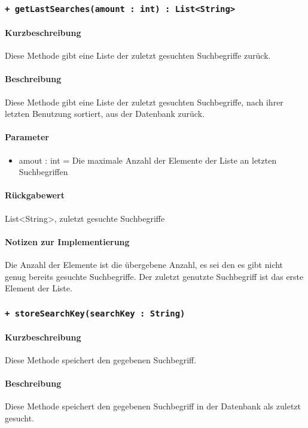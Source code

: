 \subsubsection{\texttt{+ getLastSearches(amount : int) : List<String>}}%
\paragraph*{Kurzbeschreibung}
Diese Methode gibt eine Liste der zuletzt gesuchten Suchbegriffe zurück.
\paragraph*{Beschreibung}
Diese Methode gibt eine Liste der zuletzt gesuchten Suchbegriffe, nach ihrer letzten Benutzung sortiert, aus der Datenbank zurück.
\paragraph*{Parameter}
\begin{itemize}
    \item amout : int = Die maximale Anzahl der Elemente der Liste an letzten Suchbegriffen
\end{itemize}
\paragraph*{Rückgabewert}
List<String>, zuletzt gesuchte Suchbegriffe
\paragraph*{Notizen zur Implementierung}
Die Anzahl der Elemente ist die übergebene Anzahl, es sei den es gibt nicht genug bereits gesuchte Suchbegriffe.
Der zuletzt genutzte Suchbegriff ist das erste Element der Liste.

\subsubsection{\texttt{+ storeSearchKey(searchKey : String)}}%
\paragraph*{Kurzbeschreibung}
Diese Methode speichert den gegebenen Suchbegriff.
\paragraph*{Beschreibung}
Diese Methode speichert den gegebenen Suchbegriff in der Datenbank als zuletzt gesucht.
